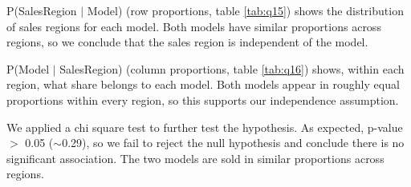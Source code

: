 P(SalesRegion $\vert$ Model) (row proportions, table \ref{tab:q15}) shows the distribution of sales regions for each model. Both models have similar proportions across regions, so we conclude that the sales region is independent of the model.

\begin{table}[H]
    \centering
    \caption{Conditional probabilities: P(SalesRegion $\vert$ Model)}
    \label{tab:q15}
\end{table}

P(Model $\vert$ SalesRegion) (column proportions, table \ref{tab:q16}) shows, within each region, what share belongs to each model. Both models appear in roughly equal proportions within every region, so this supports our independence assumption.

\begin{table}[H]
    \centering
    \caption{Conditional probabilities: P(Model $\vert$ SalesRegion)}
    \label{tab:q16}
\end{table}

We applied a chi square test to further test the hypothesis. As expected, p-value $>$ 0.05 ($\sim$0.29), so we fail to reject the null hypothesis and conclude there is no significant association. The two models are sold in similar proportions across regions.